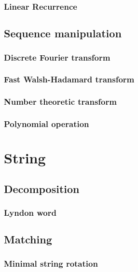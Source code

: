 \documentclass[titlepage,a4paper,10pt]{article}
\begin{document}
\begin{multicols}{2}
\begin{spacing}{0.8}
{				\subsubsection{Linear Recurrence}
					
			\subsection{Sequence manipulation}
				\subsubsection{Discrete Fourier transform}
					
				\subsubsection{Fast Walsh-Hadamard transform}
					
				\subsubsection{Number theoretic transform}
					
				\subsubsection{Polynomial operation}
					
		\section{String}
			\subsection{Decomposition}
				\subsubsection{Lyndon word}
					
			\subsection{Matching}
				\subsubsection{Minimal string rotation}
					
}
\end{spacing}
\end{multicols}
\end{document}
